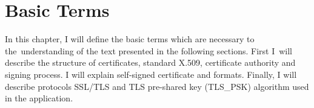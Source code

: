 \documentclass[
  twoside, 12pt, 
  printed, %
  notable,   %
  lof,     %
  lot,     %
]{fithesis3}
\begin{document}
\chapter{Basic Terms}
In this chapter, I will define the basic terms which are necessary to the~understanding of the 
text presented in the following sections. First I~will describe the structure of certificates, 
standard X.509, certificate authority and signing process. I will explain self-signed certificate 
and formats. Finally, I will describe protocols SSL/TLS and TLS pre-shared key (TLS\_PSK) 
algorithm used in the application.

\end{document}

